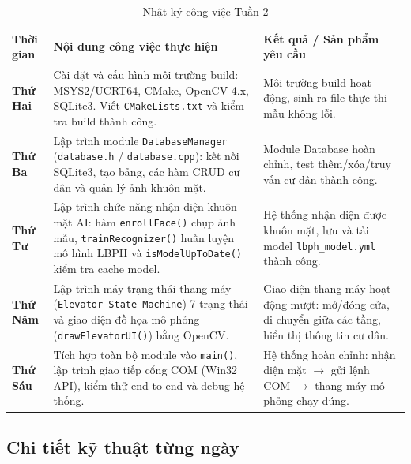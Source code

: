 \documentclass[12pt,a4paper]{article}
\begin{document}
\begin{table}[H]
    \centering
    \renewcommand{\arraystretch}{1.6}
    \begin{tabularx}{\textwidth}{|>{\bfseries\centering\arraybackslash}p{2cm}|>{\arraybackslash}X|>{\arraybackslash}p{4.5cm}|}
        \hline
        \rowcolor{lightblue}
        \textbf{Thời gian} & \textbf{Nội dung công việc thực hiện} & \textbf{Kết quả / Sản phẩm yêu cầu} \\
        \hline
        Thứ Hai &
        Cài đặt và cấu hình môi trường build: MSYS2/UCRT64, CMake, OpenCV 4.x, SQLite3. Viết \texttt{CMakeLists.txt} và kiểm tra build thành công. &
        Môi trường build hoạt động, sinh ra file thực thi mẫu không lỗi. \\
        \hline
        Thứ Ba &
        Lập trình module \texttt{DatabaseManager} (\texttt{database.h} / \texttt{database.cpp}): kết nối SQLite3, tạo bảng, các hàm CRUD cư dân và quản lý ảnh khuôn mặt. &
        Module Database hoàn chỉnh, test thêm/xóa/truy vấn cư dân thành công. \\
        \hline
        Thứ Tư &
        Lập trình chức năng nhận diện khuôn mặt AI: hàm \texttt{enrollFace()} chụp ảnh mẫu, \texttt{trainRecognizer()} huấn luyện mô hình LBPH và \texttt{isModelUpToDate()} kiểm tra cache model. &
        Hệ thống nhận diện được khuôn mặt, lưu và tải model \texttt{lbph\_model.yml} thành công. \\
        \hline
        Thứ Năm &
        Lập trình máy trạng thái thang máy (\texttt{Elevator State Machine}) 7 trạng thái và giao diện đồ họa mô phỏng (\texttt{drawElevatorUI()}) bằng OpenCV. &
        Giao diện thang máy hoạt động mượt: mở/đóng cửa, di chuyển giữa các tầng, hiển thị thông tin cư dân. \\
        \hline
        Thứ Sáu &
        Tích hợp toàn bộ module vào \texttt{main()}, lập trình giao tiếp cổng COM (Win32 API), kiểm thử end-to-end và debug hệ thống. &
        Hệ thống hoàn chỉnh: nhận diện mặt $\rightarrow$ gửi lệnh COM $\rightarrow$ thang máy mô phỏng chạy đúng. \\
        \hline
    \end{tabularx}
    \caption{Nhật ký công việc Tuần 2}
    \label{tab:week2_log}
\end{table}

\subsection{Chi tiết kỹ thuật từng ngày}
\end{document}
